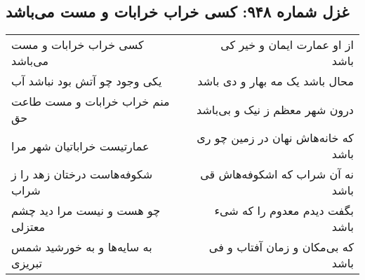 \begin{center}
\section*{غزل شماره ۹۴۸: کسی خراب خرابات و مست می‌باشد}
\label{sec:0948}
\begin{longtable}{l p{0.5cm} r}
کسی خراب خرابات و مست می‌باشد
&&
از او عمارت ایمان و خیر کی باشد
\\
یکی وجود چو آتش بود نباشد آب
&&
محال باشد یک مه بهار و دی باشد
\\
منم خراب خرابات و مست طاعت حق
&&
درون شهر معظم ز نیک و بی‌باشد
\\
عمارتیست خراباتیان شهر مرا
&&
که خانه‌هاش نهان در زمین چو ری باشد
\\
شکوفه‌هاست درختان زهد را ز شراب
&&
نه آن شراب که اشکوفه‌هاش قی باشد
\\
چو هست و نیست مرا دید چشم معتزلی
&&
بگفت دیدم معدوم را که شیء باشد
\\
به سایه‌ها و به خورشید شمس تبریزی
&&
که بی‌مکان و زمان آفتاب و فی باشد
\\
\end{longtable}
\end{center}
